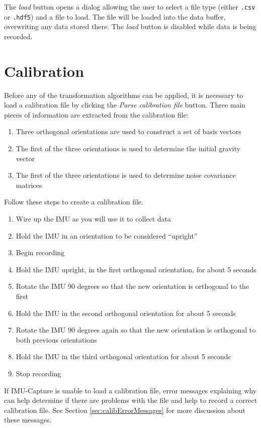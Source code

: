 \documentclass[11pt,letterpaper,article,oneside]{memoir}
\newcommand{\name}{IMU-Capture}
\newcommand{\csv}{\texttt{.csv}}
\newcommand{\hdf}{\texttt{.hdf5}}
\begin{document}
The \emph{load} button opens a dialog allowing the user to select a file type
(either \csv{} or \hdf{}) and a file to load. The file will be loaded into the
data buffer, overwriting any data stored there.  The \emph{load} button is
disabled while data is being recorded.


\section{Calibration}

Before any of the transformation algorithms can be applied, it is necessary to load a
calibration file by clicking the \emph{Parse calibration file} button. Three
main pieces of information are extracted from the calibration file:
\begin{enumerate}
\item Three orthogonal orientations are used to construct a set of basis vectors
\item The first of the three orientations is used to determine the initial gravity vector
\item The first of the three orientations is used to determine noise covariance matrices
\end{enumerate}


Follow these steps to create a calibration file.

\begin{enumerate}
\item Wire up the IMU as you will use it to collect data
\item Hold the IMU in an orientation to be considered ``upright''
\item Begin recording
\item Hold the IMU upright, in the first orthogonal orientation, for about 5 seconds
\item Rotate the IMU 90 degrees so that the new orientation is orthogonal to the first
\item Hold the IMU in the second orthogonal orientation for about 5 seconds
\item Rotate the IMU 90 degrees again so that the new orientation is orthogonal to both previous orientations
\item Hold the IMU in the third orthogonal orientation for about 5 seconds
\item Stop recording
\end{enumerate}

If \name{} is unable to load a calibration file, error messages explaining why
can help determine if there are problems with the file and help to record a
correct calibration file. See Section \ref{sec:calibErrorMessages} for more
discussion about these messages.
\end{document}
